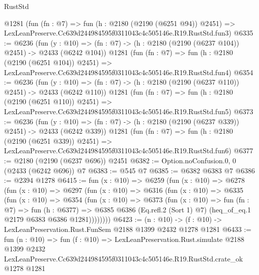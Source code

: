 \begin{lexlean}{RustStd}
\begin{coremodule}
    @1281
    (fun (fn : @7) =>
    fun (h : @2180 (@2190 (@6251 @94)) @2451) =>
    LexLeanPreserve.Cc639d244984595f0311043c4c505146e.R19.RustStd.fun3)
@6335 := @6236
    (fun (y : @10) => (fn : @7) -> (h : @2180 (@2190 (@6237 @104)) @2451) -> @2433 (@6242 @104))
    @1281
    (fun (fn : @7) =>
    fun (h : @2180 (@2190 (@6251 @104)) @2451) =>
    LexLeanPreserve.Cc639d244984595f0311043c4c505146e.R19.RustStd.fun4)
@6354 := @6236
    (fun (y : @10) => (fn : @7) -> (h : @2180 (@2190 (@6237 @110)) @2451) -> @2433 (@6242 @110))
    @1281
    (fun (fn : @7) =>
    fun (h : @2180 (@2190 (@6251 @110)) @2451) =>
    LexLeanPreserve.Cc639d244984595f0311043c4c505146e.R19.RustStd.fun5)
@6373 := @6236
    (fun (y : @10) => (fn : @7) -> (h : @2180 (@2190 (@6237 @339)) @2451) -> @2433 (@6242 @339))
    @1281
    (fun (fn : @7) =>
    fun (h : @2180 (@2190 (@6251 @339)) @2451) =>
    LexLeanPreserve.Cc639d244984595f0311043c4c505146e.R19.RustStd.fun6)
@6377 := @2180 (@2190 (@6237 @696)) @2451
@6382 := Option.noConfusion.{0, 0} (@2433 (@6242 @696)) @7
@6383 := @545 @7
@6385 := @6382 @6383 @7
@6386 := @2394 @1278
@6415 := fun (x : @10) =>
  @6259
    (fun (x : @10) =>
    @6278
      (fun (x : @10) =>
      @6297
        (fun (x : @10) =>
        @6316
          (fun (x : @10) =>
          @6335
            (fun (x : @10) =>
            @6354
              (fun (x : @10) =>
              @6373
                (fun (x : @10) =>
                fun (fn : @7) =>
                fun (h : @6377) =>
                @6385 @6386 (Eq.refl.{2} (Sort 1) @7) (heq_of_eq.{1} @2179 @6383 @6386 @1281))))))))
@6423 := (n : @10) -> (f : @10) -> LexLeanPreservation.Rust.FunSem @2188 @1399 @2432 @1278 @1281
@6433 := fun (n : @10) =>
  fun (f : @10) =>
  LexLeanPreservation.Rust.simulate
    @2188
    @1399
    @2432
    LexLeanPreserve.Cc639d244984595f0311043c4c505146e.R19.RustStd.crate_ok
    @1278
    @1281
\end{coremodule}
\end{lexlean}
